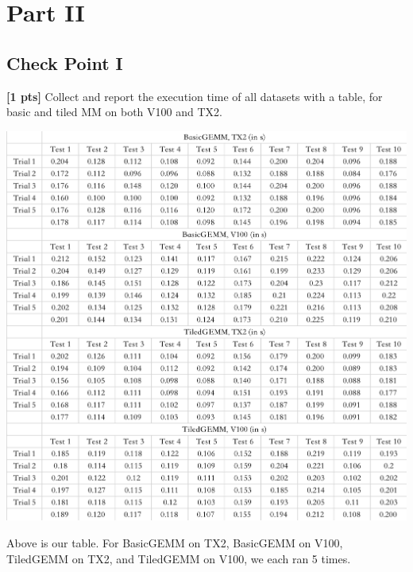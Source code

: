 \documentclass{mcmthesis}
\begin{document}
\section{Part II}
\subsection{Check Point I} 
\textbf{[1 pts]} Collect and report the execution time of all datasets with a table, for basic and tiled MM on both V100 and TX2.
\begin{center}
\includegraphics[width=15cm]{time.png}
\end{center}
Above is our table. For BasicGEMM on TX2, BasicGEMM on V100, TiledGEMM on TX2, and TiledGEMM on V100, we each ran 5 times. 
\pagebreak
\end{document}
